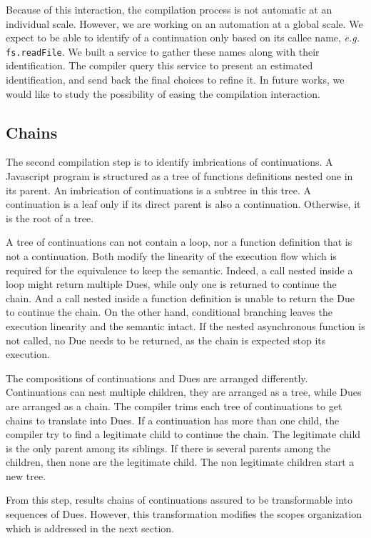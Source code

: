 Because of this interaction, the compilation process is not automatic at an individual scale.
However, we are working on an automation at a global scale.
We expect to be able to identify of a continuation only based on its callee name, \textit{e.g.} \texttt{fs.readFile}.
We built a service to gather these names along with their identification.
The compiler query this service to present an estimated identification, and send back the final choices to refine it.
In future works, we would like to study the possibility of easing the compilation interaction.

\subsection{Chains}

The second compilation step is to identify imbrications of continuations.
A Javascript program is structured as a tree of functions definitions nested one in its parent.
An imbrication of continuations is a subtree in this tree.
A continuation is a leaf only if its direct parent is also a continuation.
Otherwise, it is the root of a tree.

A tree of continuations can not contain a loop, nor a function definition that is not a continuation.
Both modify the linearity of the execution flow which is required for the equivalence to keep the semantic.
Indeed, a call nested inside a loop might return multiple Dues, while only one is returned to continue the chain.
And a call nested inside a function definition is unable to return the Due to continue the chain.
On the other hand, conditional branching leaves the execution linearity and the semantic intact.
If the nested asynchronous function is not called, no Due needs to be returned, as the chain is expected stop its execution.

The compositions of continuations and Dues are arranged differently.
Continuations can nest multiple children, they are arranged as a tree, while Dues are arranged as a chain.
The compiler trims each tree of continuations to get chains to translate into Dues.
If a continuation has more than one child, the compiler try to find a legitimate child to continue the chain.
The legitimate child is the only parent among its siblings.
If there is several parents among the children, then none are the legitimate child.
The non legitimate children start a new tree.

From this step, results chains of continuations assured to be transformable into sequences of Dues.
However, this transformation modifies the scopes organization which is addressed in the next section.

